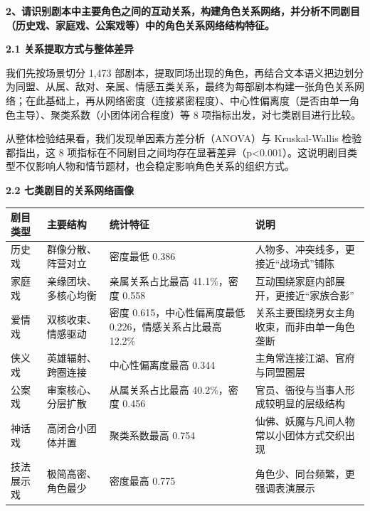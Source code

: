 \documentclass[12pt, a4paper]{article}
\begin{document}


{\fontsize{13bp}{20bp}\heiti\bfseries
2、请识别剧本中主要角色之间的互动关系，构建角色关系网络，并分析不同剧目（历史戏、家庭戏、公案戏等）中的角色关系网络结构特征。
}

\vspace{6pt}

{\fontsize{13bp}{18bp}\heiti\bfseries 2.1 关系提取方式与整体差异}

\vspace{4pt}

{\fontsize{12bp}{20bp}\kaishu
我们先按场景切分 1{,}473 部剧本，提取同场出现的角色，再结合文本语义把边划分为同盟、从属、敌对、亲属、情感五类关系，最终为每部剧本构建一张角色关系网络；在此基础上，再从网络密度（连接紧密程度）、中心性偏离度（是否由单一角色主导）、聚类系数（小团体闭合程度）等 8 项指标出发，对七类剧目进行比较。
}

{\fontsize{12bp}{20bp}\kaishu
从整体检验结果看，我们发现单因素方差分析（ANOVA）与 Kruskal-Wallis 检验都指出，这 8 项指标在不同剧目之间均存在显著差异（p<0.001）。这说明剧目类型不仅影响人物和情节题材，也会稳定影响角色关系的组织方式。
}

\vspace{6pt}

{\fontsize{13bp}{18bp}\heiti\bfseries 2.2 七类剧目的关系网络画像}

\vspace{4pt}

{\fontsize{10.5bp}{15bp}\selectfont
\renewcommand{\arraystretch}{1.25}
\begin{center}
\begin{tabular}{C{0.16\textwidth} L{0.22\textwidth} L{0.24\textwidth} L{0.22\textwidth}}
\toprule
剧目类型 & 主要结构 & 统计特征 & 说明 \tabularnewline
\midrule
历史戏 & 群像分散、阵营对立 & 密度最低 0.386 & 人物多、冲突线多，更接近“战场式”铺陈 \tabularnewline
家庭戏 & 亲缘团块、多核心均衡 & 亲属关系占比最高 41.1\%，密度 0.558 & 互动围绕家庭内部展开，更接近“家族合影” \tabularnewline
爱情戏 & 双核收束、情感驱动 & 密度 0.615，中心性偏离度最低 0.226，情感关系占比最高 12.2\% & 关系主要围绕男女主角收束，而非由单一角色垄断 \tabularnewline
侠义戏 & 英雄辐射、跨圈连接 & 中心性偏离度最高 0.344 & 主角常连接江湖、官府与同盟圈层 \tabularnewline
公案戏 & 审案核心、分层扩散 & 从属关系占比最高 40.2\%，密度 0.456 & 官员、衙役与当事人形成较明显的层级结构 \tabularnewline
神话戏 & 高闭合小团体并置 & 聚类系数最高 0.754 & 仙佛、妖魔与凡间人物常以小团体方式交织出现 \tabularnewline
技法展示戏 & 极简高密、角色最少 & 密度最高 0.775 & 角色少、同台频繁，更强调表演展示 \tabularnewline
\bottomrule
\end{tabular}
\end{center}
}
\end{document}
